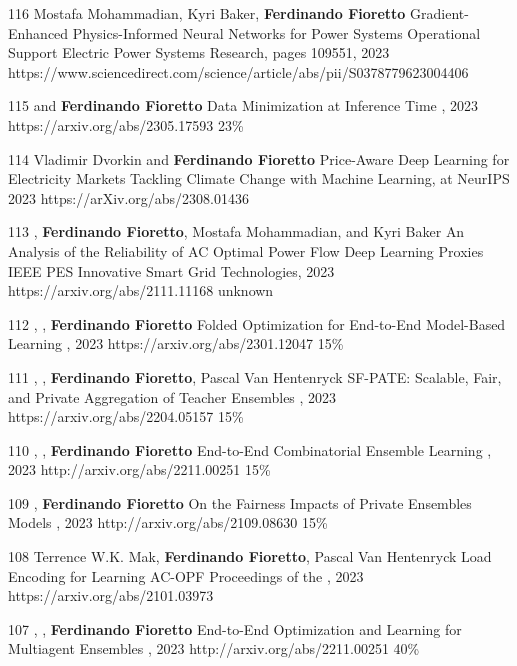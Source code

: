 \begin{pubs}
\journalentry
	{116}
	{Mostafa Mohammadian, Kyri Baker, \textbf{Ferdinando Fioretto}}
	{Gradient-Enhanced Physics-Informed Neural Networks for Power Systems Operational Support}
	{Electric Power Systems Research, pages 109551, 2023}
	{https://www.sciencedirect.com/science/article/abs/pii/S0378779623004406}

\confentry
	{115}
	{ and {\bf Ferdinando Fioretto}}
	{Data Minimization at Inference Time}
	{\procNeurIPS, 2023}
	{https://arxiv.org/abs/2305.17593}
	{23\%}

\wsentry
	{114}
 	{Vladimir Dvorkin and {\bf Ferdinando Fioretto}}
  	{Price-Aware Deep Learning for Electricity Markets}
  	{Tackling Climate Change with Machine Learning, at NeurIPS 2023}
  	{https://arXiv.org/abs/2308.01436}

\confentry
	{113}
	{, {\bf Ferdinando Fioretto}, Mostafa Mohammadian, and Kyri Baker}
	{An Analysis of the Reliability of AC Optimal Power Flow Deep Learning Proxies}
	{IEEE PES Innovative Smart Grid Technologies, 2023}
	{https://arxiv.org/abs/2111.11168}
	{unknown}

\confentry 
	{112} %
	{, , {\bf Ferdinando Fioretto}}
	{Folded Optimization for End-to-End Model-Based Learning}
	{\procIJCAI, 2023}
	{https://arxiv.org/abs/2301.12047}
	{15\%}

\confentry
    {111} %
	{, , {\bf Ferdinando Fioretto}, Pascal Van Hentenryck}
	{SF-PATE: Scalable, Fair, and Private Aggregation of Teacher Ensembles}
    {\procIJCAI, 2023}
	{https://arxiv.org/abs/2204.05157}
    {15\%}

\confentry
    {110} %
	{, , {\bf Ferdinando Fioretto}}
	{End-to-End Combinatorial Ensemble Learning}
    {\procIJCAI, 2023}
	{http://arxiv.org/abs/2211.00251}
    {15\%}

\confentry
    {109} %
	{, {\bf Ferdinando Fioretto}}
	{On the Fairness Impacts of Private Ensembles Models}
    {\procIJCAI, 2023}
	{http://arxiv.org/abs/2109.08630}
    {15\%}

\wsentry
	{108} %
	{Terrence W.K. Mak, {\bf Ferdinando Fioretto}, Pascal Van Hentenryck}
	{Load Encoding for Learning AC-OPF}
	{Proceedings of the , 2023}
	{https://arxiv.org/abs/2101.03973}

\confentry
    {107} %
	{, , {\bf Ferdinando Fioretto}}
	{End-to-End Optimization and Learning for Multiagent Ensembles}
    {\procAAMAS, 2023}
	{http://arxiv.org/abs/2211.00251}
    {40\%}


\end{pubs}
